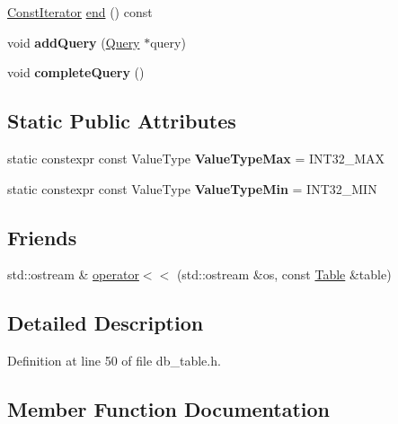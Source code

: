\begin{DoxyCompactItemize}
\item 
\hyperlink{class_table_1_1_iterator_impl}{Const\+Iterator} \hyperlink{class_table_a7fa70114351a55ad1602f48396d13359}{end} () const
\item 
\mbox{\label{class_table_a7a5b44db06f077bea635ce5c0c24f0bf}} 
void {\bfseries add\+Query} (\hyperlink{class_query}{Query} $\ast$query)
\item 
\mbox{\label{class_table_a2a88ee4aa176f0763b90bc71a82813a8}} 
void {\bfseries complete\+Query} ()
\end{DoxyCompactItemize}
\subsection*{Static Public Attributes}
\begin{DoxyCompactItemize}
\item 
\mbox{\label{class_table_a18c1c0fc4538dcd9c38b66afa63b1739}} 
static constexpr const Value\+Type {\bfseries Value\+Type\+Max} = I\+N\+T32\+\_\+\+M\+AX
\item 
\mbox{\label{class_table_a91fea5fb967510c0c6e66efff8c39f7d}} 
static constexpr const Value\+Type {\bfseries Value\+Type\+Min} = I\+N\+T32\+\_\+\+M\+IN
\end{DoxyCompactItemize}
\subsection*{Friends}
\begin{DoxyCompactItemize}
\item 
std\+::ostream \& \hyperlink{class_table_ac91202688e17b1c145b7d98d90ace349}{operator$<$$<$} (std\+::ostream \&os, const \hyperlink{class_table}{Table} \&table)
\end{DoxyCompactItemize}


\subsection{Detailed Description}


Definition at line 50 of file db\+\_\+table.\+h.



\subsection{Member Function Documentation}
\mbox{\label{class_table_a9df56e33923bbff648f98367d723ddb5}} 
